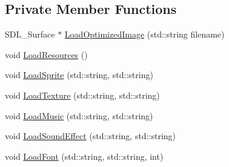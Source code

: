 \subsection*{Private Member Functions}
\begin{DoxyCompactItemize}
\item 
S\-D\-L\-\_\-\-Surface $\ast$ \hyperlink{classn8_1_1_resource_manager_acf5f0aafedcb3ed0c2a9b4e8518c8092}{Load\-Optimized\-Image} (std\-::string filename)
\item 
void \hyperlink{classn8_1_1_resource_manager_aa3424e9950ae39330cecba06286b6af1}{Load\-Resources} ()
\item 
void \hyperlink{classn8_1_1_resource_manager_ab8cb4600e3ee61439ddba958c2c1c3bf}{Load\-Sprite} (std\-::string, std\-::string)
\item 
void \hyperlink{classn8_1_1_resource_manager_a65cd9b6e010bdac87976e464c580b93a}{Load\-Texture} (std\-::string, std\-::string)
\item 
void \hyperlink{classn8_1_1_resource_manager_a21c0d9fbdf9413c4e5e9ac0e81461010}{Load\-Music} (std\-::string, std\-::string)
\item 
void \hyperlink{classn8_1_1_resource_manager_a38702603536a2f7c396cb0dcaab2df0d}{Load\-Sound\-Effect} (std\-::string, std\-::string)
\item 
void \hyperlink{classn8_1_1_resource_manager_ae80f49455160d64a2cf27099ba0d128f}{Load\-Font} (std\-::string, std\-::string, int)
\end{DoxyCompactItemize}
